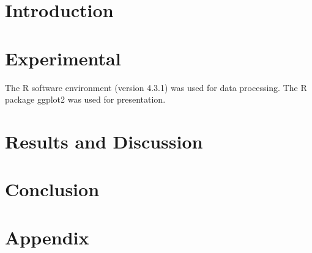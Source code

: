 \documentclass{SpectroDW}
\title{}
\author{Liliana Schefer}{lschefe@student.ethz.ch}
\begin{document}
\maketitle
\newpage

\section*{Introduction}

\section*{Experimental}



The R software environment \cite{R} (version 4.3.1) was used for data processing. The R package ggplot2 \cite{ggplot2} was used for presentation.

\section*{Results and Discussion}

\section*{Conclusion}

\printbibliography

\appendix
  \section*{Appendix}
  \renewcommand\thefigure{A\arabic{figure}} %
  \renewcommand\thetable{A\arabic{table}} %
  \renewcommand\theequation{A\arabic{equation}} %
  \setcounter{figure}{0}
  \setcounter{table}{0}
  \setcounter{equation}{0}

\end{document}
